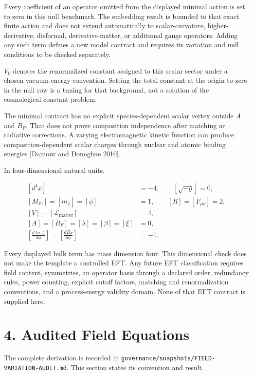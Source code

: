 \documentclass[
  american,
  11pt,
  letterpaper,
]{article}
\begin{document}
Every coefficient of an operator omitted from the displayed minimal action is set to zero in this null benchmark. The embedding result is bounded to that exact finite action and does not extend automatically to scalar-curvature, higher-derivative, disformal, derivative-matter, or additional gauge operators. Adding any such term defines a new model contract and requires its variation and null conditions to be checked separately.

\(V_0\) denotes the renormalized constant assigned to this scalar sector under a chosen vacuum-energy convention. Setting the total constant at the origin to zero in the null row is a tuning for that background, not a solution of the cosmological-constant problem.

The minimal contract has no explicit species-dependent scalar vertex outside \(A\) and \(B_F\). That does not prove composition independence after matching or radiative corrections. A varying electromagnetic kinetic function can produce composition-dependent scalar charges through nuclear and atomic binding energies {[}Damour and Donoghue 2010{]}.

In four-dimensional natural units,

\[
\begin{aligned}
\left[d^4x\right]&=-4,\qquad [\sqrt{-g}]=0,\\
[M_{\mathrm{Pl}}]=[m_\phi]=[\phi]&=1,\qquad [R]=[F_{\mu\nu}]=2,\\
[V]=[\mathcal L_{\mathrm{matter}}]&=4,\\
[A]=[B_F]=[\lambda]=[\beta]=[\xi]&=0,\\
\left[\frac{d\ln A}{d\phi}\right]
=\left[\frac{dB_F}{d\phi}\right]&=-1.
\end{aligned}
\tag{7}
\]

Every displayed bulk term has mass dimension four. This dimensional check does not make the template a controlled EFT. Any future EFT classification requires field content, symmetries, an operator basis through a declared order, redundancy rules, power counting, explicit cutoff factors, matching and renormalization conventions, and a process-energy validity domain. None of that EFT contract is supplied here.

\section{4. Audited Field Equations}\label{audited-field-equations}

The complete derivation is recorded in \nolinkurl{governance/snapshots/FIELD-VARIATION-AUDIT.md}. This section states its convention and result.
\end{document}
